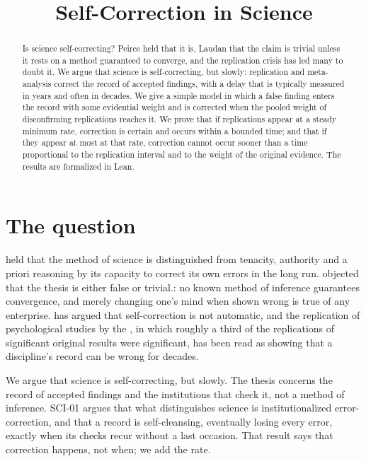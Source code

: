 \documentclass{situationist-preprint}
\title{Self-Correction in Science}
\begin{document}
\maketitle

\begin{abstract}
Is science self-correcting? Peirce held that it is, Laudan that the claim is trivial unless it rests on a method guaranteed to converge, and the replication crisis has led many to doubt it. We argue that science is self-correcting, but slowly: replication and meta-analysis correct the record of accepted findings, with a delay that is typically measured in years and often in decades. We give a simple model in which a false finding enters the record with some evidential weight and is corrected when the pooled weight of disconfirming replications reaches it. We prove that if replications appear at a steady minimum rate, correction is certain and occurs within a bounded time; and that if they appear at most at that rate, correction cannot occur sooner than a time proportional to the replication interval and to the weight of the original evidence. The results are formalized in Lean.
\end{abstract}

\section{The question}

\citet{Peirce1877} held that the method of science is distinguished from tenacity, authority and a priori reasoning by its capacity to correct its own errors in the long run. \citet{Laudan1981} objected that the thesis is either false or trivial.: no known method of inference guarantees convergence, and merely changing one's mind when shown wrong is true of any enterprise. \citet{Ioannidis2012} has argued that self-correction is not automatic, and the replication of psychological studies by the \citet{OSC2015}, in which roughly a third of the replications of significant original results were significant, has been read as showing that a discipline's record can be wrong for decades.

We argue that science is self-correcting, but slowly. The thesis concerns the record of accepted findings and the institutions that check it, not a method of inference. SCI-01 argues that what distinguishes science is institutionalized error-correction, and that a record is self-cleansing, eventually losing every error, exactly when its checks recur without a last occasion. That result says that correction happens, not when; we add the rate.
\end{document}
